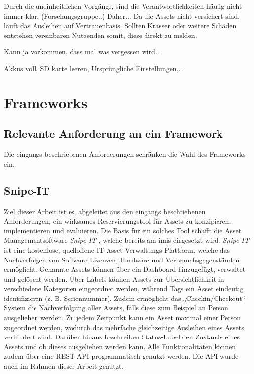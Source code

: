 Durch die uneinheitlichen Vorgänge, sind die Verantwortlichkeiten häufig nicht immer klar.
(Forschungsgruppe..) Daher... Da die Assets nicht versichert sind, läuft das Ausleihen auf
Vertrauenbasis. Sollten Krasser oder weitere Schäden entstehen vereinbaren Nutzenden somit, diese
direkt zu melden.


Kann ja vorkommen, dass mal was vergessen wird...

Akkus voll, SD karte leeren, Ursprüngliche Einstellungen,...


\section{Frameworks}

\subsection{Relevante Anforderung an ein Framework}
Die eingangs beschriebenen Anforderungen schränken die Wahl des Frameworks ein.


\subsection{Snipe-IT}
Ziel dieser Arbeit ist es, abgeleitet aus den eingangs beschriebenen Anforderungen, ein wirksames
Reservierungstool für Assets zu konzipieren, implementieren und evaluieren. Die Basis für ein
solches Tool schafft die Asset Managementsoftware \textit{Snipe-IT} \cite{noauthor_home_nodate},
welche bereits am \ac{imis} eingesetzt wird. \textit{Snipe-IT} ist eine kostenlose, quelloffene
IT-Asset-Verwaltungs-Plattform, welche das Nachverfolgen von Software-Lizenzen, Hardware und
Verbrauchsgegenständen ermöglicht. Genannte Assets können über ein Dashboard hinzugefügt, verwaltet
und gelöscht werden. Über Labels können Assets zur Übersichtlichkeit in verschiedene Kategorien
eingeordnet werden, während Tags ein Asset eindeutig identifizieren (z. B. Seriennummer). Zudem
ermöglicht das „Checkin/Checkout“-System die Nachverfolgung aller Assets, falls diese zum Beispiel
an Person ausgeliehen werden. Zu jedem Zeitpunkt kann ein Asset maximal einer Person zugeordnet
werden, wodurch das mehrfache gleichzeitige Ausleihen eines Assets verhindert wird. Darüber hinaus
beschreiben Status-Label den Zustands eines Assets und ob dieses ausgeliehen werden kann. Alle
Funktionalitäten können zudem über eine REST-API programmatisch genutzt werden. Die API wurde auch im
Rahmen dieser Arbeit genutzt.

